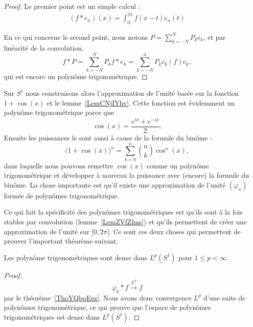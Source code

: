 \begin{proof}
	Le premier point est un simple calcul :
	\begin{subequations}
		\begin{align}
			(f*e_n)(x)=\int_0^{2\pi}f(x-t)e_n(t)
		\end{align}
	\end{subequations}

	En ce qui concerne le second point, nous notons \( P=\sum_{k=-N}^NP_ke_k\), et par linéarité de la convolution,
	\begin{equation}
		f*P=\sum_{k=-N}^NP_kf*e_k=\sum_{k=-N}^nP_kc_k(f)e_k,
	\end{equation}
	qui est encore un polynôme trigonométrique.
\end{proof}

\begin{example} \label{ExDMnVSWF}
	Sur \( S^1\) nous construisons alors l'approximation de l'unité basée sur la fonction \( 1+\cos(x)\) et le lemme~\ref{LemCNjIYhv}. Cette fonction est évidemment un polynôme trigonométrique parce que
	\begin{equation}
		\cos(x)=\frac{  e^{ix}+ e^{-ix} }{2}.
	\end{equation}
	Ensuite les puissances le sont aussi à cause de la formule du binôme :
	\begin{equation}
		\big( 1+\cos(x) \big)^n=\sum_{k=0}^n\binom{ n }{ k }\cos^n(x),
	\end{equation}
	dans laquelle nous pouvons remettre \( \cos(x)\) comme un polynôme trigonométrique et développer à nouveau la puissance avec (encore) la formule du binôme. La chose importante est qu'il existe une approximation de l'unité \( (\varphi_n)\) formée de polynômes trigonométrique.

	Ce qui fait la spécificité des polynômes trigonométriques est qu'ils sont à la fois stables par convolution (lemme~\ref{LemZVfZlms}) et qu'ils permettent de créer une approximation de l'unité sur \( \mathopen[ 0 , 2\pi \mathclose]\). Ce sont ces deux choses qui permettent de prouver l'important théorème suivant.
\end{example}

\begin{theorem} \label{ThoQGPSSJq}
	Les polynôme trigonométriques sont dense dans \( L^p(S^1)\) pour \( 1\leq p<\infty\).
\end{theorem}

\begin{proof}

	\begin{equation}
		\varphi_k*f\stackrel{L^p}{\to}f
	\end{equation}
	par le théorème~\ref{ThoYQbqEez}. Nous avons donc convergence \( L^p\) d'une suite de polynômes trigonométrique, ce qui prouve que l'espace de polynômes trigonométriques est dense dans \( L^p(S^1)\).
\end{proof}

